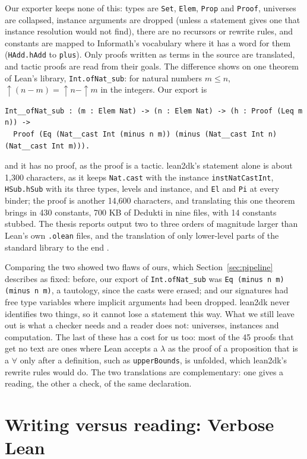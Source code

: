 \documentclass{easychair}
\newcommand{\ttt}[1]{\texttt{#1}}
\begin{document}
Our exporter keeps none of this: types are \ttt{Set}, \ttt{Elem}, \ttt{Prop} and \ttt{Proof},
universes are collapsed, instance arguments are dropped (unless a statement gives one that instance
resolution would not find), there are no recursors or rewrite
rules, and constants are mapped to Informath's vocabulary where it has a word for them
(\ttt{HAdd.hAdd} to \ttt{plus}). Only proofs written as terms in the source are translated, and
tactic proofs are read from their goals. The difference shows on one theorem of Lean's library,
\ttt{Int.ofNat\_sub}: for natural numbers $m \leq n$, $\uparrow(n - m) = \uparrow n - \uparrow m$
in the integers. Our export is
\begin{lstlisting}
Int__ofNat_sub : (m : Elem Nat) -> (n : Elem Nat) -> (h : Proof (Leq m n)) ->
  Proof (Eq (Nat__cast Int (minus n m)) (minus (Nat__cast Int n) (Nat__cast Int m))).
\end{lstlisting}
and it has no proof, as the proof is a tactic. lean2dk's statement alone is about 1,300
characters, as it keeps \ttt{Nat.cast} with the instance \ttt{instNatCastInt}, \ttt{HSub.hSub}
with its three types, levels and instance, and \ttt{El} and \ttt{Pi} at every binder; the proof is
another 14,600 characters, and translating this one theorem brings in 430 constants, 700 KB
of Dedukti in nine files, with 14 constants stubbed. The thesis reports output two to three
orders of magnitude larger than Lean's own \ttt{.olean} files, and the translation of only
lower-level parts of the standard library to the end \cite[Section~7.1]{vaishnav-2026}.

Comparing the two showed two flaws of ours, which Section~\ref{sec:pipeline} describes as fixed:
before, our export of \ttt{Int.ofNat\_sub} was \ttt{Eq (minus n m) (minus n m)}, a tautology,
since the casts were erased; and our signatures had free type variables where implicit
arguments had been dropped. lean2dk never identifies two things, so it cannot lose a statement
this way. What we still leave out is what a checker needs and a reader does not: universes,
instances and computation. The last of these has a cost for us too: most of the 45 proofs that
get no text are ones where Lean accepts a $\lambda$ as the proof of a proposition that is a
$\forall$ only after a definition, such as \ttt{upperBounds}, is unfolded, which lean2dk's
rewrite rules would do. The two translations are complementary: one gives a reading, the other a
check, of the same declaration.

\section{Writing versus reading: Verbose Lean}
\label{sec:verbose}
\end{document}
